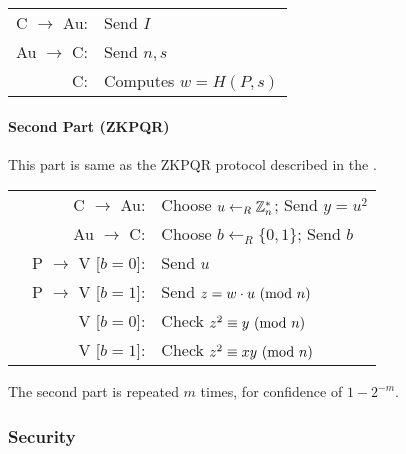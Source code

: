 \bigskip

\begin{center}
	\begin{tabular}{rl}
	C $\rightarrow$ Au: & Send $I$\\
	Au $\rightarrow$ C: & Send $n, s$\\
	C: & Computes $w = H(P, s)$\\
\end{tabular}
\end{center}

\paragraph{Second Part (ZKPQR)}
This part is same as the ZKPQR protocol described in the \cite{GMR}.

\bigskip

\begin{center}
\begin{tabular}{lrl}
	& C $\rightarrow$ Au: & Choose $u \leftarrow_R \Bbb{Z}_{n}^{*}$; Send $y = u^2$\\
	& Au $\rightarrow$ C: & Choose $b \leftarrow_R \{0, 1\} $; Send $b$\\
	& P $\rightarrow$ V [$b = 0$]: & Send $u$\\
	& P $\rightarrow$ V [$b = 1$]: & Send $z = w \cdot u \ (\mathrm{mod}\ n)$\\
	& V [$b = 0$]: & Check $z^2 \equiv y \ (\mathrm{mod}\ n)$\\
	& V [$b = 1$]: & Check $z^2 \equiv xy \ (\mathrm{mod}\ n)$\\
\end{tabular}
\end{center}

\bigskip

The second part is repeated $m$ times, for confidence of $1 - 2^{-m}$.

\subsubsection{Security}


